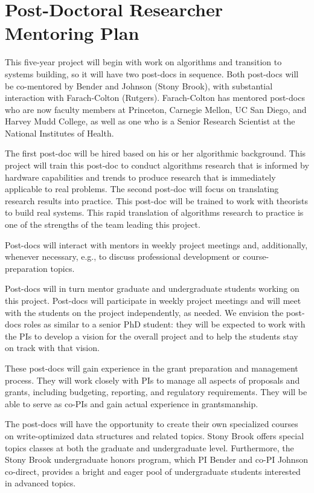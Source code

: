 
\section*{Post-Doctoral Researcher Mentoring Plan}
\label{postdoc}



This five-year project will begin with work on algorithms and
transition to systems building, so it will have two post-docs in
sequence.  Both post-docs will be co-mentored by Bender and Johnson (Stony Brook),
with substantial interaction with Farach-Colton (Rutgers).  Farach-Colton has
mentored post-docs who are now faculty members at Princeton, Carnegie
Mellon, UC San Diego, and Harvey Mudd College, as well as one who is a
Senior Research Scientist at the National Institutes of Health.

The first post-doc will be hired based on his or her algorithmic
background.  This project will train this post-doc to conduct
algorithms research that is informed by hardware capabilities and
trends to produce research that is immediately applicable to real
problems.  The second post-doc will focus on translating research
results into practice.  This post-doc will be trained to work with
theorists to build real systems.  This rapid translation of algorithms
research to practice is one of the strengths of the team leading this
project.

Post-docs will interact with mentors in weekly project meetings
and, additionally,  whenever  necessary, e.g., to discuss professional development or course-preparation topics.

Post-docs will in turn mentor graduate and undergraduate students
working on this project.  Post-docs will participate in weekly project
meetings and will meet with the students on the project independently,
as needed.  We envision the post-docs roles as similar to a senior PhD
student: they will be expected to work with the PIs to develop a
vision for the overall project and to help the students stay on track
with that vision. 

These post-docs will gain experience in the grant preparation and
management process.  They will work closely with PIs to manage all
aspects of proposals and grants, including budgeting, reporting, and
regulatory requirements. They will be able to serve as co-PIs and
gain actual experience in grantsmanship.

The post-docs will have the opportunity to create their own
specialized courses on write-optimized data structures and related
topics.  Stony Brook offers special topics classes at both the
graduate and undergraduate level.  Furthermore, the Stony Brook
undergraduate 
honors program, which PI Bender and co-PI Johnson co-direct, provides
a bright and eager pool of undergraduate students interested in
advanced topics.

